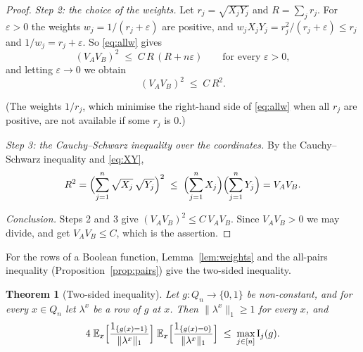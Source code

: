 \documentclass[11pt,reqno]{amsart}
\newtheorem{theorem}{Theorem}[section]
\theoremstyle{definition}
\theoremstyle{remark}
\numberwithin{equation}{section}
\theoremstyle{named}
\theoremstyle{plain}
\newcommand{\E}{\mathbb{E}}
\newcommand{\I}{\operatorname{I}}
\newcommand{\eps}{\varepsilon}
\newcommand{\norm}[1]{\lVert #1\rVert_1}
\begin{document}
\begin{proof}
\smallskip
\emph{Step 2: the choice of the weights.} Let $r_j=\sqrt{X_jY_j}$ and $R=\sum_{j}r_j$. For $\eps>0$
the weights $w_j=1/(r_j+\eps)$ are positive, and
$w_jX_jY_j=r_j^{2}/(r_j+\eps)\le r_j$ and $1/w_j=r_j+\eps$. So \eqref{eq:allw} gives
\[
   (V_{A}V_{B})^{2}\;\le\;C\,R\,(R+n\eps)\qquad\text{for every }\eps>0,
\]
and letting $\eps\to0$ we obtain
\[
   (V_{A}V_{B})^{2}\;\le\;C\,R^{2}.
\]

(The weights $1/r_j$, which minimise the right-hand side of \eqref{eq:allw} when all $r_j$ are
positive, are not available if some $r_j$ is $0$.)

\smallskip
\emph{Step 3: the Cauchy--Schwarz inequality over the coordinates.} By the Cauchy--Schwarz
inequality and \eqref{eq:XY},
\[
   R^{2}=\Bigl(\sum_{j=1}^{n}\sqrt{X_j}\,\sqrt{Y_j}\Bigr)^{2}\;\le\;
   \Bigl(\sum_{j=1}^{n}X_j\Bigr)\Bigl(\sum_{j=1}^{n}Y_j\Bigr)=V_{A}V_{B}.
\]

\smallskip
\emph{Conclusion.} Steps 2 and 3 give $(V_{A}V_{B})^{2}\le C\,V_{A}V_{B}$. Since
$V_{A}V_{B}>0$ we may divide, and get $V_{A}V_{B}\le C$, which is the assertion.
\end{proof}

For the rows of a Boolean function, Lemma~\ref{lem:weights} and the all-pairs inequality (Proposition~\ref{prop:pairs}) give the two-sided
inequality.

\begin{theorem}[Two-sided inequality]\label{thm:two}
Let $g\colon Q_n\to\{0,1\}$ be non-constant, and for every $x\in Q_n$ let $\lambda^{x}$ be a row of
$g$ at $x$. Then $\norm{\lambda^{x}}\ge1$ for every $x$, and
\[
   4\;\E_x\Bigl[\frac{1_{\{g(x)=1\}}}{\norm{\lambda^{x}}}\Bigr]\;
      \E_x\Bigl[\frac{1_{\{g(x)=0\}}}{\norm{\lambda^{x}}}\Bigr]\;\le\;\max_{j\in[n]}\I_j(g).
\]
\end{theorem}
\end{document}
